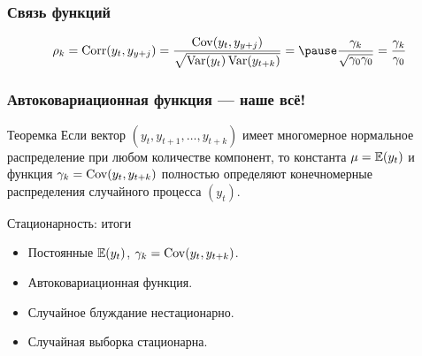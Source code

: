 \begin{frame}
  \frametitle{Связь функций}

\[
\rho_k = \Corr(y_t, y_{y+j}) = \frac{\Cov(y_t, y_{y+j})}{\sqrt{\Var(y_t)\Var(y_{t+k})}} =  \pause
\frac{\gamma_k}{\sqrt{\gamma_0 \gamma_0 }} = \frac{\gamma_k}{\gamma_0}
\]  

\end{frame}



\begin{frame}
  \frametitle{Автоковариационная функция — наше всё!}

  \begin{block}{Теоремка}
    Если вектор $(y_t, y_{t+1}, \ldots, y_{t+k})$ имеет многомерное нормальное распределение 
    при любом количестве компонент, то константа $\mu = \mathbb{E}(y_t)$ и функция $\gamma_k = \operatorname{Cov}(y_t, y_{t+k})$
    полностью определяют конечномерные распределения случайного процесса $(y_t)$.
  \end{block}

\end{frame}



\begin{frame}{Стационарность: итоги}

  \begin{itemize}[<+->]
    \item Постоянные $\mathbb{E}(y_t)$, $\gamma_k = \operatorname{Cov}(y_t, y_{t+k})$.
    \item \alert{Автоковариационная} функция. 
    \item Случайное блуждание нестационарно. 
    \item Случайная выборка стационарна.
  \end{itemize}
\end{frame}

